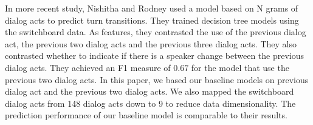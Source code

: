 In more recent study, Nishitha and Rodney \cite{SSS1510313} used a model based on N grams of dialog acts to predict turn transitions.
They trained decision tree models using the switchboard data. As features, they contrasted the use of the previous dialog act, the previous two dialog acts and the previous three dialog acts. They also contrasted whether to indicate if there is a speaker change between the previous dialog acts. They achieved an F1 measure of $0.67$ for the model that use the previous two dialog acts. 
%
In this paper, we based our baseline models on previous dialog act and the previous two dialog acts. We also mapped the switchboard dialog acts from 148 dialog acts down to 9 to reduce data dimensionality. The prediction performance of our baseline model is comparable to their results.

